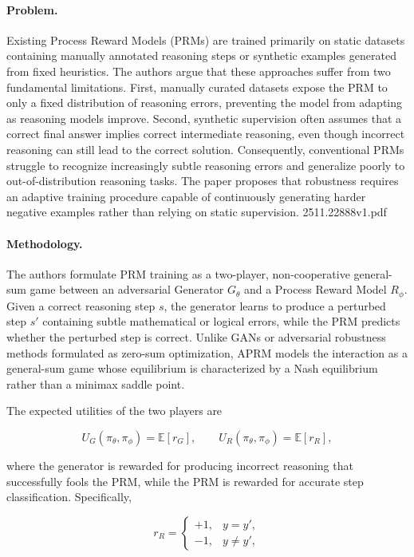 \documentclass[11pt]{article}
\begin{document}
\paragraph{Problem.}
Existing Process Reward Models (PRMs) are trained primarily on static datasets containing manually annotated reasoning steps or synthetic examples generated from fixed heuristics. The authors argue that these approaches suffer from two fundamental limitations. First, manually curated datasets expose the PRM to only a fixed distribution of reasoning errors, preventing the model from adapting as reasoning models improve. Second, synthetic supervision often assumes that a correct final answer implies correct intermediate reasoning, even though incorrect reasoning can still lead to the correct solution. Consequently, conventional PRMs struggle to recognize increasingly subtle reasoning errors and generalize poorly to out-of-distribution reasoning tasks. The paper proposes that robustness requires an adaptive training procedure capable of continuously generating harder negative examples rather than relying on static supervision. 2511.22888v1.pdf

\paragraph{Methodology.}
The authors formulate PRM training as a two-player, non-cooperative general-sum game between an adversarial Generator \(G_\theta\) and a Process Reward Model \(R_\phi\). Given a correct reasoning step \(s\), the generator learns to produce a perturbed step \(s'\) containing subtle mathematical or logical errors, while the PRM predicts whether the perturbed step is correct. Unlike GANs or adversarial robustness methods formulated as zero-sum optimization, APRM models the interaction as a general-sum game whose equilibrium is characterized by a Nash equilibrium rather than a minimax saddle point.

The expected utilities of the two players are

\[
U_G(\pi_\theta,\pi_\phi)
=
\mathbb{E}[r_G],
\qquad
U_R(\pi_\theta,\pi_\phi)
=
\mathbb{E}[r_R],
\]

where the generator is rewarded for producing incorrect reasoning that successfully fools the PRM, while the PRM is rewarded for accurate step classification. Specifically,

\[
r_R=
\begin{cases}
+1,& y=y',\\
-1,& y\neq y',
\end{cases}
\]
\end{document}

